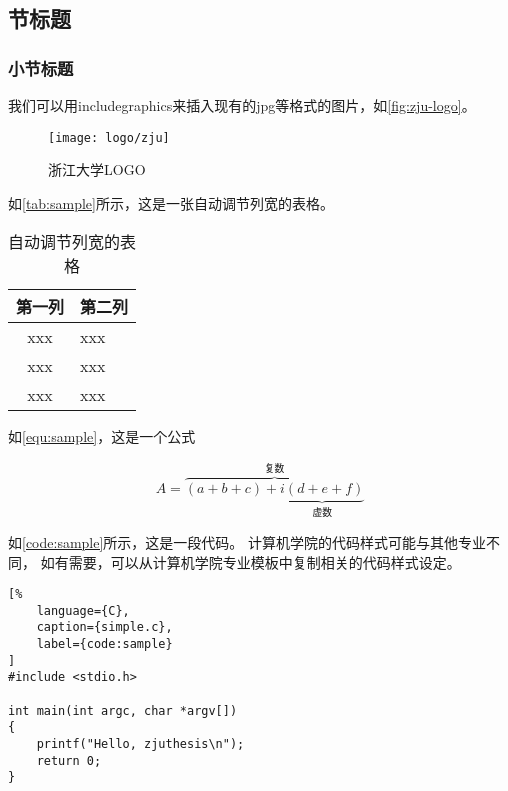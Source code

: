 \subsection{节标题}

\subsubsection{小节标题}

\par 我们可以用includegraphics来插入现有的jpg等格式的图片，如\autoref{fig:zju-logo}。

\begin{figure}[ht]
    \centering
    \texttt{[image: logo/zju]}
    \caption{\label{fig:zju-logo}浙江大学LOGO}
\end{figure}

\par 如\autoref{tab:sample}所示，这是一张自动调节列宽的表格。

\begin{table}[ht]
    \caption{\label{tab:sample}自动调节列宽的表格}
    \begin{tabularx}{\linewidth}{|c|X<{\centering}|}
        \hline
        第一列 & 第二列 \\ \hline
        xxx & xxx \\ \hline
        xxx & xxx \\ \hline
        xxx & xxx \\ \hline
    \end{tabularx}
\end{table}

\par 如\autoref{equ:sample}，这是一个公式

\begin{equation}
    \label{equ:sample}
    A=\overbrace{(a+b+c)+\underbrace{i(d+e+f)}_{\text{虚数}}}^{\text{复数}}
\end{equation}

\par 如\autoref{code:sample}所示，这是一段代码。
计算机学院的代码样式可能与其他专业不同，
如有需要，可以从计算机学院专业模板中复制相关的代码样式设定。

\begin{lstlisting}[%
    language={C},
    caption={simple.c},
    label={code:sample}
]
#include <stdio.h>

int main(int argc, char *argv[])
{
    printf("Hello, zjuthesis\n");
    return 0;
}
\end{lstlisting}

